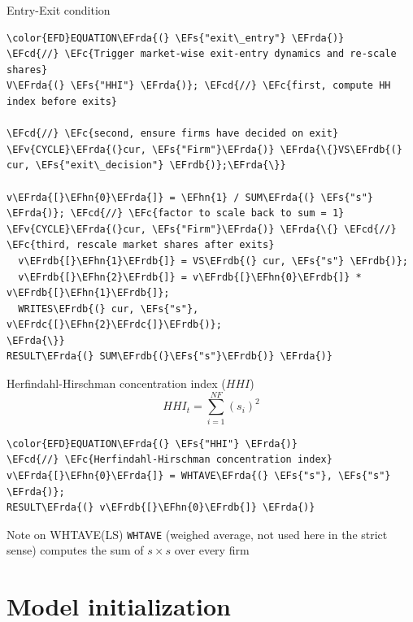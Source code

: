 \documentclass[bigger,aspectratio=169]{beamer}
\newcommand{\EFc}[1]{\textcolor{EFc}{#1}} %
\newcommand{\EFcd}[1]{\textcolor{EFcd}{#1}} %
\newcommand{\EFs}[1]{\textcolor{EFs}{#1}} %
\newcommand{\EFv}[1]{\textcolor{EFv}{#1}} %
\newcommand{\EFhn}[1]{\textcolor{EFhn}{\textbf{#1}}} %
\newcommand{\EFrda}[1]{\textcolor{EFrda}{#1}} %
\newcommand{\EFrdb}[1]{\textcolor{EFrdb}{#1}} %
\newcommand{\EFrdc}[1]{\textcolor{EFrdc}{#1}} %
\begin{document}
\begin{frame}[label={sec:org4a25dba},fragile]{Entry-Exit condition}
 \begin{Code}
\begin{Verbatim}
\color{EFD}EQUATION\EFrda{(} \EFs{"exit\_entry"} \EFrda{)}
\EFcd{//} \EFc{Trigger market-wise exit-entry dynamics and re-scale shares}
V\EFrda{(} \EFs{"HHI"} \EFrda{)}; \EFcd{//} \EFc{first, compute HH index before exits}

\EFcd{//} \EFc{second, ensure firms have decided on exit}
\EFv{CYCLE}\EFrda{(}cur, \EFs{"Firm"}\EFrda{)} \EFrda{\{}VS\EFrdb{(} cur, \EFs{"exit\_decision"} \EFrdb{)};\EFrda{\}}

v\EFrda{[}\EFhn{0}\EFrda{]} = \EFhn{1} / SUM\EFrda{(} \EFs{"s"} \EFrda{)}; \EFcd{//} \EFc{factor to scale back to sum = 1}
\EFv{CYCLE}\EFrda{(}cur, \EFs{"Firm"}\EFrda{)} \EFrda{\{} \EFcd{//} \EFc{third, rescale market shares after exits}
  v\EFrdb{[}\EFhn{1}\EFrdb{]} = VS\EFrdb{(} cur, \EFs{"s"} \EFrdb{)};
  v\EFrdb{[}\EFhn{2}\EFrdb{]} = v\EFrdb{[}\EFhn{0}\EFrdb{]} * v\EFrdb{[}\EFhn{1}\EFrdb{]};
  WRITES\EFrdb{(} cur, \EFs{"s"}, v\EFrdc{[}\EFhn{2}\EFrdc{]}\EFrdb{)};
\EFrda{\}}
RESULT\EFrda{(} SUM\EFrdb{(}\EFs{"s"}\EFrdb{)} \EFrda{)}
\end{Verbatim}
\end{Code}
\end{frame}
\begin{frame}[label={sec:org11f2617},fragile]{Herfindahl-Hirschman concentration index (\(HHI\))}
 \begin{equation}
HHI_{t} = \sum_{i=1}^{NF} (s_{i})^2
\end{equation}


\begin{Code}
\begin{Verbatim}
\color{EFD}EQUATION\EFrda{(} \EFs{"HHI"} \EFrda{)}
\EFcd{//} \EFc{Herfindahl-Hirschman concentration index}
v\EFrda{[}\EFhn{0}\EFrda{]} = WHTAVE\EFrda{(} \EFs{"s"}, \EFs{"s"} \EFrda{)};
RESULT\EFrda{(} v\EFrdb{[}\EFhn{0}\EFrdb{]} \EFrda{)}
\end{Verbatim}
\end{Code}
\begin{block}{Note on WHTAVE(LS)}
\texttt{WHTAVE} (weighed average, not used here in the strict sense) computes the sum of \(s\times s\) over every firm
\end{block}
\end{frame}
\section{Model initialization}
\label{sec:orgd62dbe0}
\end{document}
